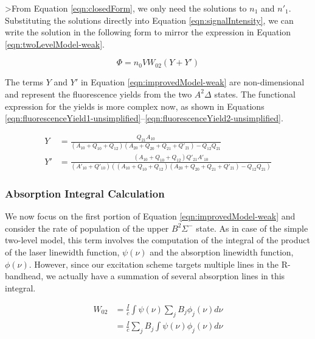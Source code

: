 >From Equation \ref{eqn:closedForm}, we only need the solutions to \(n_1\) and \(n'_1\).
Substituting the solutions directly into Equation \ref{eqn:signalIntensity}, we can write the solution in the following form to mirror the expression in Equation \ref{eqn:twoLevelModel-weak}.

\begin{equation}
  \Phi = n_0VW_{02}(Y + Y')
  \label{eqn:improvedModel-weak}
\end{equation}


The terms \(Y\) and \(Y'\) in Equation \ref{eqn:improvedModel-weak} are non-dimensional and represent the fluorescence yields from the two \(A^2\Delta\) states.
The functional expression for the yields is more complex now, as shown in Equations \ref{eqn:fluorescenceYield1-unsimplified}--\ref{eqn:fluorescenceYield2-unsimplified}.

\begin{align}
  Y &= \frac{ Q_{21} A_{10} }{ ( A_{10} + Q_{10} + Q_{12} )( A_{20} + Q_{20} + Q_{21} + Q'_{21} ) - Q_{12}Q_{21} }
  \label{eqn:fluorescenceYield1-unsimplified}\\
  Y' &= \frac{ ( A_{10} + Q_{10} + Q_{12} )Q'_{21} A'_{10} }{ ( A'_{10} + Q'_{10} ) ( ( A_{10} + Q_{10} + Q_{12} )( A_{20} + Q_{20} + Q_{21} + Q'_{21} ) - Q_{12}Q_{21} ) }
  \label{eqn:fluorescenceYield2-unsimplified}
\end{align}

\subsubsection{Absorption Integral Calculation}
\label{subsubsec:improved-model-absorption-integral-calculation}

We now focus on the first portion of Equation \ref{eqn:improvedModel-weak} and consider the rate of population of the upper \(B^2\Sigma^-\) state.
As in case of the simple two-level model, this term involves the computation of the integral of the product of the laser linewidth function, \(\psi(\nu)\) and the absorption linewidth function, \(\phi(\nu)\).
However, since our excitation scheme targets multiple lines in the R-bandhead, we actually have a summation of several absorption lines in this integral.

\begin{align}
  W_{02} & = \frac{I}{c} \int \psi(\nu) \sum_j B_j \phi_j (\nu) d\nu \nonumber \\
        & = \frac{I}{c} \sum_j B_j \int \psi(\nu)\phi_j(\nu) d\nu
  \label{eqn:pumpingRate}
\end{align}

